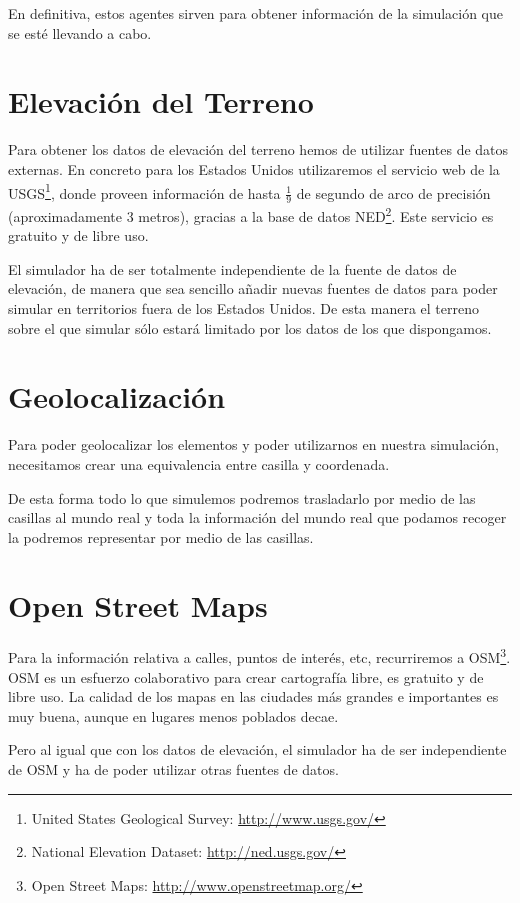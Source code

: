En definitiva, estos agentes sirven para obtener información de la simulación
que se esté llevando a cabo.

\section*{Elevación del Terreno}

Para obtener los datos de elevación del terreno hemos de utilizar fuentes de
datos externas. En concreto para los Estados Unidos utilizaremos el servicio
web de la USGS\footnote{United States Geological Survey:
\url{http://www.usgs.gov/}}, donde proveen información de hasta $ \tfrac{1}{9} $
de segundo de arco de precisión (aproximadamente 3 metros), gracias a la base de
datos NED\footnote{National Elevation Dataset: \url{http://ned.usgs.gov/}}. Este
servicio es gratuito y de libre uso.

El simulador ha de ser totalmente independiente de la fuente de datos de
elevación, de manera que sea sencillo añadir nuevas fuentes de datos para poder
simular en territorios fuera de los Estados Unidos. De esta manera el terreno
sobre el que simular sólo estará limitado por los datos de los que dispongamos.

\section*{Geolocalización}
Para poder geolocalizar los elementos y
poder utilizarnos en nuestra simulación, necesitamos crear una equivalencia
entre casilla y coordenada.

De esta forma todo lo que simulemos podremos trasladarlo por medio de las
casillas al mundo real y toda la información del mundo real que podamos recoger
la podremos representar por medio de las casillas.

\section*{Open Street Maps}

Para la información relativa a calles, puntos de interés, etc, recurriremos a
OSM\footnote{Open Street Maps: \url{http://www.openstreetmap.org/}}. OSM es un
esfuerzo colaborativo para crear cartografía libre, es gratuito y de libre
uso\cite{Pinto09}. La calidad de los mapas en las ciudades más grandes e
importantes es muy buena, aunque en lugares menos poblados decae.

Pero al igual que con los datos de elevación, el simulador ha de ser
independiente de OSM y ha de poder utilizar otras fuentes de datos.

